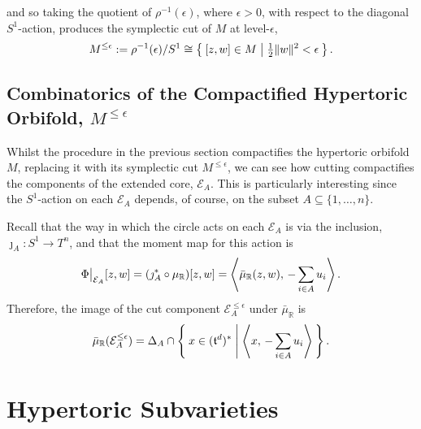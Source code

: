 \documentclass{amsart}
\newcommand{\ra}{\rightarrow}
\newcommand{\e}{\epsilon}
\newcommand{\RR}{\mathbb{R}}
\newcommand{\mcE}{\mathcal{E}}
\newcommand{\mft}{\mathfrak{t}}
\newcommand\restr[2]{{%
		\left.\kern-\nulldelimiterspace %
		#1 %
		\vphantom{\big|} %
		\right|_{#2} %
}}
\begin{document}
	and so taking the quotient of $\rho^{-1}(\e)$, where $\e > 0$, with respect to the diagonal $S^{1}$-action, produces the symplectic cut of $M$ at level-$\e$, 
	\begin{equation*}
		M^{\leq \e} := \rho^{-1}(\e)/S^{1} \cong \Set{[z,w] \in M | \tfrac{1}{2}\|w\|^{2} < \e}.
	\end{equation*}
	
	\subsection{Combinatorics of the Compactified Hypertoric Orbifold, $M^{\leq \e}$}
	
	Whilst the procedure in the previous section compactifies the hypertoric orbifold $M$, replacing it with its symplectic cut $M^{\leq \e}$, we can see how cutting compactifies the components of the extended core, $\mcE_{A}$. This is particularly interesting since the $S^{1}$-action on each $\mcE_{A}$ depends, of course, on the subset $A \subseteq \{1, \ldots, n\}$.
	
	Recall that the way in which the circle acts on each $\mcE_{A}$ is via the inclusion, $\jmath_{A}: S^{1} \ra T^{n}$, and that the moment map for this action is
	\[
		\restr{\Phi}{\mcE_{A}}[z,w] = (\jmath_{A}^{\ast} \circ \mu_{\RR})[z,w] = \left\langle \bar{\mu}_{\RR}(z,w), \, -\sum_{i \in A} u_{i} \right\rangle.
	\]
	Therefore, the image of the cut component $\mcE_{A}^{\leq \e}$ under $\bar{\mu}_{\RR}$ is
	\[
		\bar{\mu}_{\RR}(\mcE_{A}^{\leq \e}) = \Delta_{A} \cap \Set{x \in (\mft^{d})^{\ast } | \left\langle x,\, -\sum_{i \in A}u_{i} \right\rangle }.
	\]
	
	\section{Hypertoric Subvarieties}
	
	
	  
	
	
\end{document}
